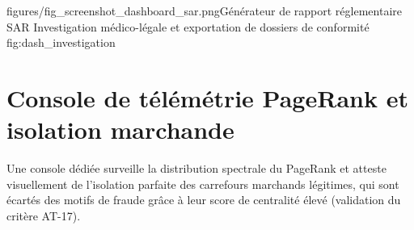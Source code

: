 %
{figures/fig_screenshot_dashboard_sar.png}{Générateur de rapport réglementaire SAR}%
{Investigation médico-légale et exportation de dossiers de conformité}%
{fig:dash_investigation}

\section{Console de télémétrie PageRank et isolation marchande}

Une console dédiée surveille la distribution spectrale du PageRank et atteste visuellement de l'isolation parfaite des carrefours marchands légitimes, qui sont écartés des motifs de fraude grâce à leur score de centralité élevé (validation du critère AT-17).


\newpage
